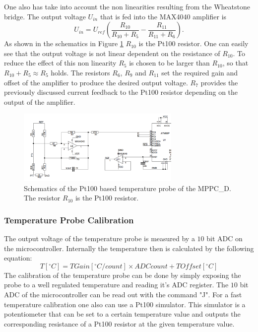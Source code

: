 \documentclass[]{article}
\begin{document}
One also has take into account the non linearities resulting from the Wheatstone bridge. The output voltage $U_{in}$ that is fed into the MAX4040 amplifier is
	\begin{equation}
		U_{in} = U_{ref}(\frac{R_{10}}{R_{10} + R_5} - \frac{R_{11}}{R_{11} + R_6}).
	\end{equation}
As shown in the schematics in Figure \ref{pt100_probe} $R_{10}$ is the Pt100 resistor. One can easily see that the output voltage is not linear dependent on the resistance
of $R_{10}$. To reduce the effect of this non linearity $R_{5}$ is chosen to be larger than $R_{10}$, so that $R_{10} + R_{5} \approx R_{5}$ holds. The resistors $R_6$, $R_9$ and 
$R_{11}$ set the required gain and offset of the amplifier to produce the desired output voltage. 
$R_7$ provides the previously discussed current feedback to the Pt100 resistor depending on the output of the amplifier.

	\begin{figure}[t]
		\centering
			\includegraphics[width=0.7\textwidth]{Figures/weinstock/pt100_probe.png}
		\caption{Schematics of the Pt100 based temperature probe of the MPPC\_D. The resistor $R_{10}$ is the Pt100 resistor.}
		\label{pt100_probe}
	\end{figure}	
 
\subsubsection{Temperature Probe Calibration}

The output voltage of the temperature probe is measured by a $10$ bit ADC on the microcontroller. Internally the temperature then is calculated by the following equation:
\begin{equation}
	T[^{\circ}C] = TGain[^{\circ}C/count] \times ADCcount + TOffset[^{\circ}C]
\end{equation}
The calibration of the temperature probe can be done by simply exposing the probe to a well regulated temperature and reading it's ADC register. The $10$ bit ADC of the microcontroller
can be read out with the command "J". For a fast temperature calibration one also can use a Pt100 simulator. This simulator is a potentiometer that can be set to a certain 
temperature value and outputs the corresponding resistance of a Pt100 resistor at the given temperature value. 
\end{document}
